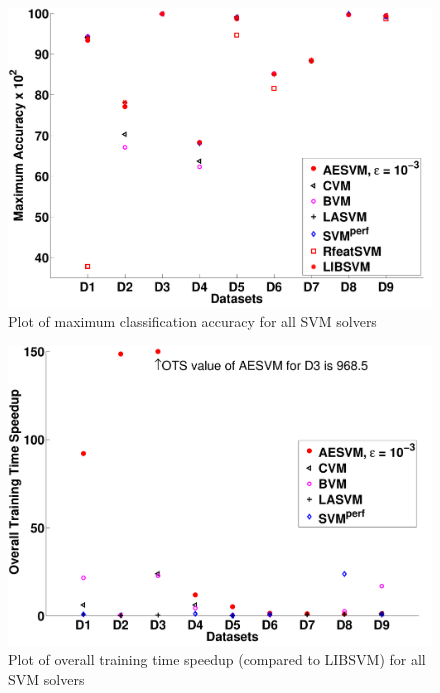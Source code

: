 \documentclass[twoside]{article}
\begin{document}
\begin{figure}[h!]
\centering
\includegraphics[scale = 0.44]{summaryMaxAcc}
\caption{Plot of maximum classification accuracy for all SVM solvers}\label{fig:resSummary2}
\end{figure}

\begin{figure}[h!]
\centering
\includegraphics[scale = 0.44]{summaryOTS}
\caption{Plot of overall training time speedup (compared to LIBSVM) for all SVM solvers}\label{fig:resSummary3}
\end{figure}
\end{document}
